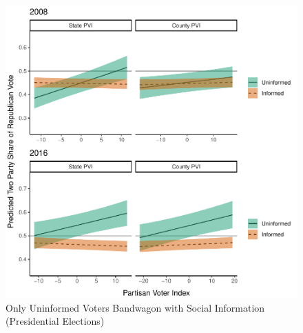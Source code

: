 \documentclass[doc,natbib,12pt]{apa6}\usepackage[]{graphicx}\usepackage[]{color}
\makeatletter
\def\maxwidth{ %
  \ifdim\Gin@nat@width>\linewidth
    \linewidth
  \else
    \Gin@nat@width
  \fi
}
\newenvironment{knitrout}{}{} %
\makeatother
\begin{document}
\begin{knitrout}
\color{fgcolor}\begin{figure}[t!!!]

{\centering \includegraphics[width=\maxwidth]{figure/gagp2v_p-1} 

}

\caption[Only Uninformed Voters Bandwagon with Social Information (Presidential Elections)]{Only Uninformed Voters Bandwagon with Social Information (Presidential Elections)}\label{fig:gagp2v_p}
\end{figure}


\end{knitrout}
    
\end{document}
